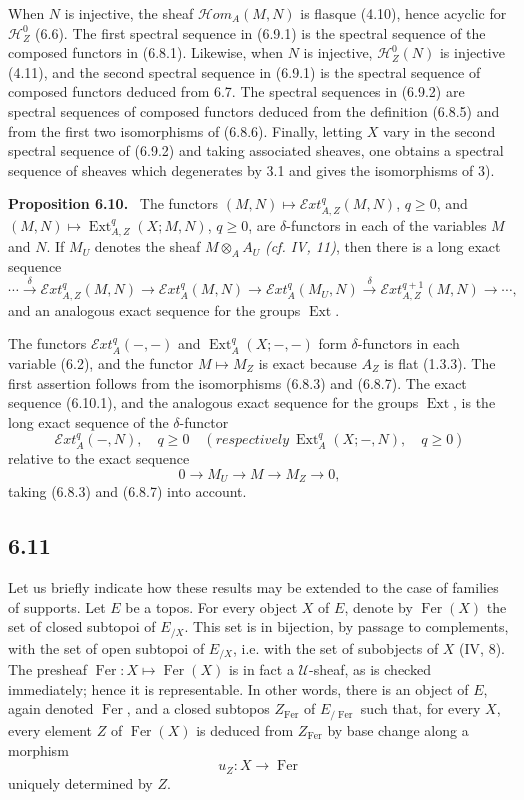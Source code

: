 \documentclass[11pt]{article}
\newcommand{\U}{\mathcal{U}}
\newcommand{\Hh}{\mathcal{H}}
\newcommand{\Ext}{\operatorname{Ext}}
\newcommand{\Hhom}{\mathcal{H}om}
\newcommand{\Eext}{\mathcal{E}xt}
\newcommand{\Fer}{\operatorname{Fer}}
\newcommand{\resp}{respectively}
\newenvironment{statement}[1]{\par\medskip\noindent\textbf{#1.}\ }{\par\medskip}
\begin{document}
When $N$ is injective, the sheaf $\Hhom_A(M,N)$ is flasque (4.10), hence acyclic for $\Hh_Z^0$ (6.6). The first spectral sequence in (6.9.1) is the spectral sequence of the composed functors in (6.8.1). Likewise, when $N$ is injective, $\Hh_Z^0(N)$ is injective (4.11), and the second spectral sequence in (6.9.1) is the spectral sequence of composed functors deduced from 6.7. The spectral sequences in (6.9.2) are spectral sequences of composed functors deduced from the definition (6.8.5) and from the first two isomorphisms of (6.8.6). Finally, letting $X$ vary in the second spectral sequence of (6.9.2) and taking associated sheaves, one obtains a spectral sequence of sheaves which degenerates by 3.1 and gives the isomorphisms of 3).

\begin{statement}{Proposition 6.10}
The functors $(M,N)\mapsto \Eext_{A,Z}^q(M,N)$, $q\geq 0$, and $(M,N)\mapsto \Ext_{A,Z}^q(X;M,N)$, $q\geq 0$, are $\delta$-functors in each of the variables $M$ and $N$. If $M_U$ denotes the sheaf $M\otimes_A A_U$ \emph{(cf. IV, 11)}, then there is a long exact sequence
\begin{equation*}
\cdots\xrightarrow{\delta}\Eext_{A,Z}^q(M,N)\to \Eext_A^q(M,N)\to \Eext_A^q(M_U,N)\xrightarrow{\delta}\Eext_{A,Z}^{q+1}(M,N)\to\cdots,\tag{6.10.1}
\end{equation*}
and an analogous exact sequence for the groups $\Ext$.
\end{statement}

The functors $\Eext_A^q(-,-)$ and $\Ext_A^q(X;-,-)$ form $\delta$-functors in each variable (6.2), and the functor $M\mapsto M_Z$ is exact because $A_Z$ is flat (1.3.3). The first assertion follows from the isomorphisms (6.8.3) and (6.8.7). The exact sequence (6.10.1), and the analogous exact sequence for the groups $\Ext$, is the long exact sequence of the $\delta$-functor
\[
        \Eext_A^q(-,N),\quad q\geq 0
        \quad(\resp\ \Ext_A^q(X;-,N),\quad q\geq 0)
\]
relative to the exact sequence
\[
        0\to M_U\to M\to M_Z\to 0,
\]
taking (6.8.3) and (6.8.7) into account.

\subsection*{6.11}
Let us briefly indicate how these results may be extended to the case of families of supports. Let $E$ be a topos. For every object $X$ of $E$, denote by $\Fer(X)$ the set of closed subtopoi of $E_{/X}$. This set is in bijection, by passage to complements, with the set of open subtopoi of $E_{/X}$, i.e. with the set of subobjects of $X$ (IV, 8). The presheaf $\Fer:X\mapsto \Fer(X)$ is in fact a $\U$-sheaf, as is checked immediately; hence it is representable. In other words, there is an object of $E$, again denoted $\Fer$, and a closed subtopos $Z_{\Fer}$ of $E_{/\Fer}$ such that, for every $X$, every element $Z$ of $\Fer(X)$ is deduced from $Z_{\Fer}$ by base change along a morphism
\[
        u_Z:X\to \Fer
\]
uniquely determined by $Z$.
\end{document}
